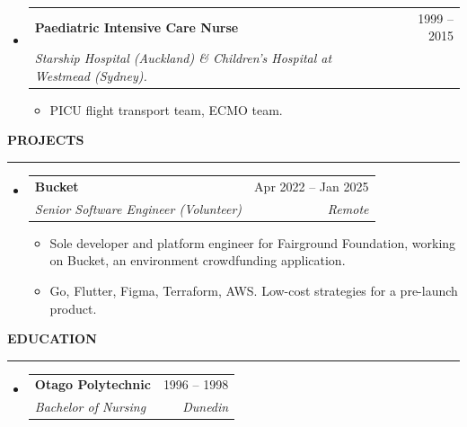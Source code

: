 \documentclass[12pt]{article}
\makeatletter
\def \entryspacing {0em}
\renewcommand{\section}[2]{\vspace{1.2ex}
  {\color{secondary}\normalsize#1\hspace{0.8em}\textbf{\MakeUppercase{#2}}}\par\vspace{-0.6ex}
  {\color{secondary}\rule{\textwidth}{0.4pt}}\vspace{-0.8ex}
}
\newcommand{\resumeEntryStart}{\begin{itemize}[leftmargin=2.5mm]}
\newcommand{\resumeEntryEnd}{\end{itemize}\vspace{\entryspacing}}
\newcommand{\resumeItemListStart}{\begin{itemize}[leftmargin=4.5mm]}
\newcommand{\resumeItemListEnd}{\end{itemize}}
\newcommand{\resumeItem}[1]{
  \item\small{
    {#1 \vspace{-0.9ex}}
  }
}
\newcommand{\resumeEntryTSDL}[4]{
  \vspace{-0.5ex}\item[]
    \begin{tabularx}{0.97\textwidth}{X@{\hspace{5em}}r}
      \textbf{\color{primary}#1} & {\firabook\color{muted}\small#2} \\
      \textit{\color{accent}\small#3} & \textit{\color{muted}\small#4} \\
    \end{tabularx}\vspace{-0.9ex}
}
\makeatother
\begin{document}
  \resumeEntryStart
    \resumeEntryTSDL
      {Paediatric Intensive Care Nurse}{1999 -- 2015}
      {Starship Hospital (Auckland) \& Children's Hospital at Westmead (Sydney).}{}
    \resumeItemListStart
      \resumeItem {PICU flight transport team, ECMO team.}
    \resumeItemListEnd
  \resumeEntryEnd

\section{\faFlask}{Projects}

  \resumeEntryStart
    \resumeEntryTSDL
      {Bucket}{Apr 2022 -- Jan 2025}
      {Senior Software Engineer (Volunteer)}{Remote}
    \resumeItemListStart
      \resumeItem {Sole developer and platform engineer for Fairground Foundation, working on Bucket, an environment crowdfunding application.}
      \resumeItem {Go, Flutter, Figma, Terraform, AWS. Low-cost strategies for a pre-launch product.}
    \resumeItemListEnd
  \resumeEntryEnd

\section{\faGraduationCap}{Education}

  \resumeEntryStart
    \resumeEntryTSDL
      {Otago Polytechnic}{1996 -- 1998}
      {Bachelor of Nursing}{Dunedin}
  \resumeEntryEnd
\end{document}
